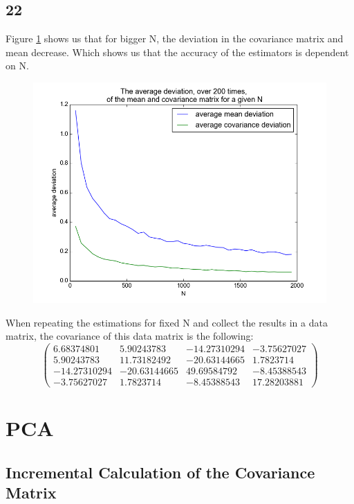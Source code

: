 \documentclass[a4paper,12px]{article}
\begin{document}
\subsection{22}
Figure \ref{fig:22} shows us that for bigger N, the deviation in the covariance matrix
 and mean decrease. Which shows us that the accuracy of the estimators is dependent on N.
\begin{figure}
    \centering
    \includegraphics[width=1\textwidth]{fig22.png}
    \caption{}
    \label{fig:22}
\end{figure}
\FloatBarrier
When repeating the estimations for fixed N and collect the results in a data
 matrix, the covariance of this data matrix is the following:
\begin{equation}
\left(\begin{matrix}
  6.68374801 &   5.90243783 & -14.27310294 & -3.75627027\\
  5.90243783 &  11.73182492 & -20.63144665 &  1.7823714 \\
-14.27310294 & -20.63144665 &  49.69584792 & -8.45388543\\
 -3.75627027 &   1.7823714  &  -8.45388543 & 17.28203881\end{matrix}\right)
\end{equation}


\section{PCA}

\subsection{Incremental Calculation of the Covariance Matrix}
\end{document}

